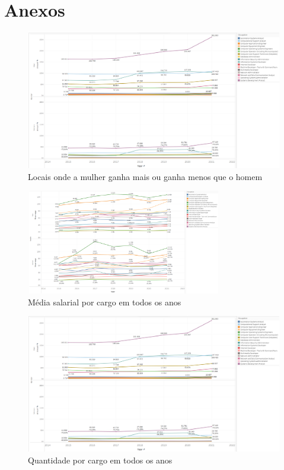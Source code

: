 \newpage

\section{Anexos}

\begin{figure}[htbp]
	\centerline{
		\includegraphics[width=250mm]{assets/5_qnt_cbo_full.PNG}
	}
	\caption{Locais onde a mulher ganha mais ou ganha menos que o homem}
	\label{fig_5_qnt_cbo_full}
\end{figure}

\begin{figure}[htbp]
	\centerline{
		\includegraphics[width=85mm]{assets/5_sal_cbo_full.PNG}
	}
	\caption{Média salarial por cargo em todos os anos}
	\label{fig_5_sal_cbo_full}
\end{figure}



\begin{figure}[htbp]
	\centerline{
		\includegraphics[width=250mm]{assets/5_qnt_cbo_full.PNG}
	}
	\caption{Quantidade por cargo em todos os anos}
	\label{fig_5_qnt_cbo_full}
\end{figure}

